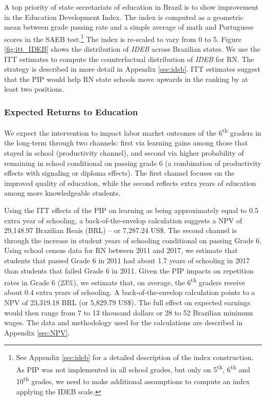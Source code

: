 \documentclass[11pt,a4paper]{article}
\begin{document}
A top priority of state secretariats of education in Brazil is to show improvement in the Education Development Index. The index is computed as a geometric mean between grade passing rate and a simple average of math and Portuguese scores in the SAEB test.\footnote{See Appendix \ref{sec:ideb} for a detailed description of the index construction. As PIP was not implemented in all school grades, but only on 5\textsuperscript{th}, 6\textsuperscript{th} and 10\textsuperscript{th} grades, we need to make additional assumptions to compute an index applying the IDEB scale.} The index is re-scaled to vary from 0 to 5. Figure \ref{fig:itt_IDEB} shows the distribution of \textit{IDEB} across Brazilian states. We use the ITT estimates to compute the counterfactual distribution of \textit{IDEB} for RN. The strategy is described in more detail in Appendix \ref{sec:ideb}. ITT estimates suggest that the PIP would help RN state schools move upwards in the ranking by at least two positions.

\subsubsection*{Expected Returns to Education} 

We expect the intervention to impact labor market outcomes of the 6\textsuperscript{th} graders in the long-term through two channels: first via learning gains among those that stayed in school (productivity channel), and second via higher probability of remaining in school conditional on passing grade 6 (a combination of productivity effects with signaling or diploma effects). The first channel focuses on the improved quality of education, while the second reflects extra years of education among more knowledgeable students.

Using the ITT effects of the PIP on learning as being approximately equal to 0.5 extra year of schooling, a back-of-the-envelop calculation suggests a NPV of 29,148.97 Brazilian Reais (BRL) -- or 7,287.24 US\$. The second channel is through the increase in student years of schooling conditional on passing Grade 6. Using school census data for RN between 2011 and 2017, we estimate that students that passed Grade 6 in 2011 had about 1.7 years of schooling in 2017 than students that failed Grade 6 in 2011. Given the PIP impacts on repetition rates in Grade 6 (23\%), we estimate that, on average, the 6\textsuperscript{th} graders receive about 0.4 extra years of schooling. A back-of-the-envelop calculation points to a NPV of 23,319.18 BRL (or 5,829.79 US\$). The full effect on expected earnings would then range from 7 to 13 thousand dollars or 28 to 52 Brazilian minimum wages. The data and methodology used for the calculations are described in Appendix \ref{sec:NPV}. 
\end{document}
